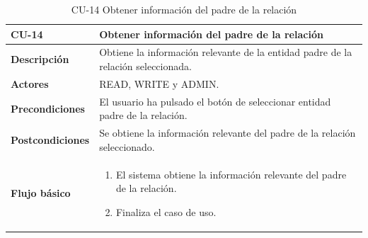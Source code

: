 \begin{table} [H]
    \centering
    \setlength{\leftmargini}{0.4cm}
	\resizebox{14cm}{!} { %
    \begin{tabular}{| m{3cm} | m{11cm} |}   
    \hline
	  \textbf{CU-14} & \textbf{Obtener información del padre de la relación} \\\hline
	  \textbf{Descripción} & Obtiene la información relevante de la entidad padre de la relación seleccionada. \\\hline
	  \textbf{Actores} & READ, WRITE y ADMIN. \\\hline
	  \textbf{Precondiciones} & El usuario ha pulsado el botón de seleccionar entidad padre de la relación. \\\hline
	  \textbf{Postcondiciones} & Se obtiene la información relevante del padre de la relación seleccionado. \\\hline
	  \textbf{Flujo básico} & 
		\begin{enumerate}
	  	\item El sistema obtiene la información relevante del padre de la relación.
		\item Finaliza el caso de uso.				
	  \end{enumerate} 	  	  
	  \\\hline
    \end{tabular}
    } %
    \caption{CU-14 Obtener información del padre de la relación}
    \label{tab:cu-obtener-informacion-padre}
\end{table}



